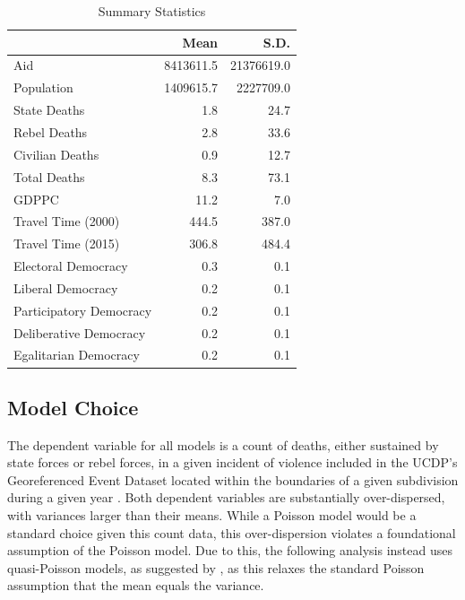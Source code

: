 \documentclass[12pt, letterpaper]{article}
\renewcommand{\cite}{\citep}
\begin{document}
	\begin{table}
		
		\caption{Summary Statistics}
		\centering
		\begin{tabular}[t]{l|r|r}
			\hline
			& Mean & S.D.\\
			\hline
			Aid & 8413611.5 & 21376619.0\\
			\hline
			Population & 1409615.7 & 2227709.0\\
			\hline
			State Deaths & 1.8 & 24.7\\
			\hline
			Rebel Deaths & 2.8 & 33.6\\
			\hline
			Civilian Deaths & 0.9 & 12.7\\
			\hline
			Total Deaths & 8.3 & 73.1\\
			\hline
			GDPPC & 11.2 & 7.0\\
			\hline
			Travel Time (2000) & 444.5 & 387.0\\
			\hline
			Travel Time (2015) & 306.8 & 484.4\\
			\hline
			Electoral Democracy & 0.3 & 0.1\\
			\hline
			Liberal Democracy & 0.2 & 0.1\\
			\hline
			Participatory Democracy & 0.2 & 0.1\\
			\hline
			Deliberative Democracy & 0.2 & 0.1\\
			\hline
			Egalitarian Democracy & 0.2 & 0.1\\
			\hline
		\end{tabular}
		\label{descstats}
	\end{table}

	
\subsection{Model Choice}

The dependent variable for all models is a count of deaths, either sustained by state forces or rebel forces, in a given incident of violence included in the UCDP’s Georeferenced Event Dataset located within the boundaries of a given subdivision during a given year \cite{sundberg2013introducing}. Both dependent variables are substantially over-dispersed, with variances larger than their means. While a Poisson model would be a standard choice given this count data, this over-dispersion violates a foundational assumption of the Poisson model. Due to this, the following analysis instead uses quasi-Poisson models, as suggested by \citet{gelmanhill}, as this relaxes the standard Poisson assumption that the mean equals the variance.
\end{document}
